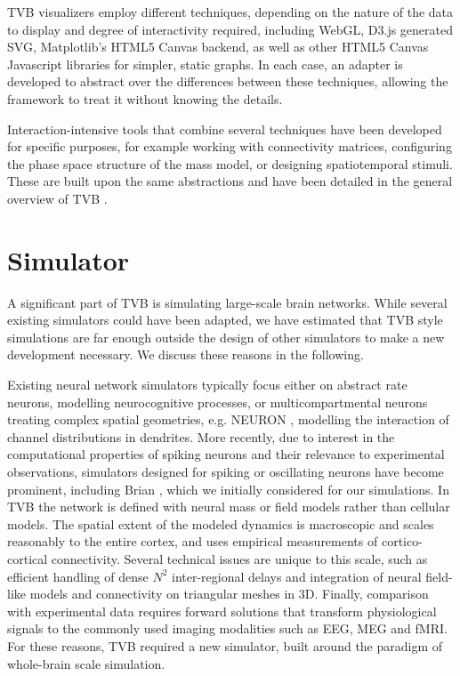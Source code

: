 \documentclass{bioinfo}
\begin{document}
TVB visualizers employ different techniques, depending on the nature of
the data to display and degree of interactivity required, including WebGL,
D3.js generated SVG, Matplotlib's HTML5 Canvas backend, as well as other
HTML5 Canvas Javascript libraries for simpler, static graphs. In each case,
an adapter is developed to abstract over the differences between these
techniques, allowing the framework to treat it without knowing the details.

Interaction-intensive tools that combine several techniques have been developed
for specific purposes, for example working with connectivity matrices, 
configuring the phase space structure of the mass model, or designing
spatiotemporal stimuli. These are built upon the same abstractions and have been
detailed in the general overview of TVB \citep{Sanz-Leon_2013}.

\section{Simulator}

A significant part of TVB is simulating large-scale brain networks. While
several existing simulators could have been adapted, we have estimated that
TVB style simulations are far enough outside the design of other simulators to
make a new development necessary. We discuss these reasons in the following. 

Existing neural network simulators typically focus either on abstract rate neurons, 
modelling neurocognitive processes, or 
multicompartmental neurons treating complex spatial
geometries, e.g. NEURON \citep{Hines_2001}, modelling the interaction of 
channel distributions in dendrites.  More recently, due to interest in
the computational properties of spiking neurons and their relevance to
experimental observations, simulators designed for spiking or oscillating neurons
have become prominent, including Brian \citep{Goodman_2009}, which we initially 
considered for our simulations.
In TVB the network is defined with neural mass or field
models \citep{Deco_2008a, Coombes_2010} rather than cellular models. The
spatial extent of the modeled dynamics is macroscopic and scales reasonably 
to the entire cortex, and uses empirical measurements of cortico-cortical
connectivity. Several technical issues are unique to this scale, such
as efficient handling of dense $N^2$ inter-regional delays and integration
of neural field-like models and connectivity on triangular meshes in 3D.
Finally, comparison with experimental data requires forward solutions
that transform physiological signals to the commonly
used imaging modalities such as EEG, MEG and fMRI.
For these reasons, TVB required a new simulator, built around the paradigm
of whole-brain scale simulation.
\end{document}
